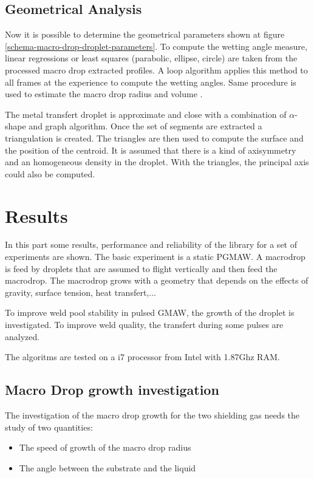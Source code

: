 \documentclass[12pt]{iopart}
\begin{document}
\subsection{Geometrical Analysis}
\label{geometrical_analize}

Now it is possible to determine the geometrical parameters shown 
at figure \ref{schema-macro-drop-droplet-parameters}. To compute the wetting 
angle measure, linear regressions or least squares (parabolic, ellipse, circle) 
are taken from the processed macro drop extracted profiles.
A loop algorithm applies this method to all frames at the experience to compute the wetting 
angles. Same procedure is used to estimate the macro drop radius and volume \cite{CHAPUIS}.

The metal transfert droplet is approximate and close with a combination of $\alpha$-shape and
graph algorithm. Once the set of segments are extracted a triangulation is created. The triangles 
are then used to compute the surface and the position of the centroid. It is assumed that there is a kind
of axisymmetry  and an homogeneous density in the droplet. With the triangles, the principal axis could also be 
computed.



\section{ Results}
In this part some results, performance and reliability of the library for a set of experiments
are shown. The basic experiment is a static PGMAW.
A macrodrop is feed by droplets that are assumed to flight vertically and
then feed the macrodrop. The macrodrop grows with a geometry that depends on the effects of gravity,
surface tension, heat transfert,...

To improve weld pool stability in pulsed GMAW, the growth of the droplet is investigated.
To improve weld quality, the transfert during some pulses are analyzed.

The algoritms are tested on a i7 processor from Intel with 1.87Ghz RAM.


\subsection{ Macro Drop growth investigation}
The investigation of the macro drop growth for the two shielding gas needs the study of two quantities:

\begin{itemize}
\item The speed of growth of the macro drop radius
\item The angle between the substrate and the liquid
\end{itemize}
\end{document}
